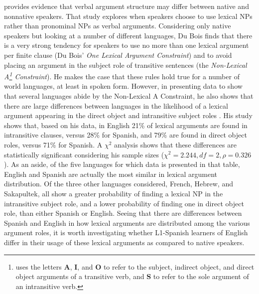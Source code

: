 \documentclass[main.tex]{subfiles}
\begin{document}
\citet{dubois:2003} provides evidence that verbal argument structure may differ between native and nonnative speakers. That study explores when speakers choose to use lexical NPs rather than pronominal NPs as verbal arguments. Considering only native speakers but looking at a number of different languages, Du Bois finds that there is a very strong tendency for speakers to use no more than one lexical argument per finite clause (Du Bois' \textit{One Lexical Argument Constraint}) and to avoid placing an argument in the subject role of transitive sentences (the \textit{Non-Lexical A\footnote{\citet{dubois:2003} uses the letters \textbf{A}, \textbf{I}, and \textbf{O} to refer to the subject, indirect object, and direct object arguments of a transitive verb, and \textbf{S} to refer to the sole argument of an intransitive verb.} Constraint}). He makes the case that these rules hold true for a number of world languages, at least in spoken form. However, in presenting data to show that several languages abide by the Non-Lexical A Constraint, he also shows that there are large differences between languages in the likelihood of a lexical argument appearing in the direct object and intransitive subject roles \citep[Table~2.5]{dubois:2003}. His study shows that, based on his data, in English 21\% of lexical arguments are found in intransitive clauses, versus 28\% for Spanish, and 79\% are found in direct object roles, versus 71\% for Spanish. A $\chi^2$ analysis shows that these differences are statistically significant considering his sample sizes ($\chi^2=2.244, df=2, \rho=0.326$). As an aside, of the five languages for which data is presented in that table, English and Spanish are actually the most similar in lexical argument distribution. Of the three other languages considered, French, Hebrew, and Sakapultek, all show a greater probability of finding a lexical NP in the intransitive subject role, and a lower probability of finding one in direct object role, than either Spanish or English. Seeing that there are differences between Spanish and English in how lexical arguments are distributed among the various argument roles, it is worth investigating whether L1-Spanish learners of English differ in their usage of these lexical arguments as compared to native speakers.
\end{document}
